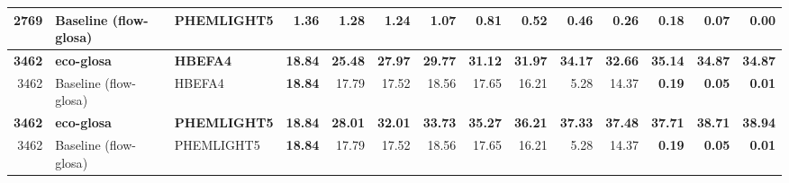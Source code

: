 \begin{table}[htb]
{\begin{tabular}{r l l r *{10}{r}}
    2769 & Baseline (\ac{flow-glosa}) & PHEMLIGHT5 & \textbf{1.36} & 1.28 & 1.24 & 1.07 & 0.81 & 0.52 & 0.46 & 0.26 & 0.18 & 0.07 & 0.00\\
    \midrule
    \textbf{3462} & \textbf{\ac{eco-glosa}} & \textbf{HBEFA4} & \textbf{18.84} & \textbf{25.48} & \textbf{27.97} & \textbf{29.77} & \textbf{31.12} & \textbf{31.97} & \textbf{34.17} & \textbf{32.66} & \textbf{35.14} & \textbf{34.87} & \textbf{34.87}\\
    3462 & Baseline (\ac{flow-glosa}) & HBEFA4 & \textbf{18.84} & 17.79 & 17.52 & 18.56 & 17.65 & 16.21 & 5.28 & 14.37 & \textbf{0.19} & \textbf{0.05} & \textbf{0.01}\\
    \textbf{3462} & \textbf{\ac{eco-glosa}} & \textbf{PHEMLIGHT5} & \textbf{18.84} & \textbf{28.01} & \textbf{32.01} & \textbf{33.73} & \textbf{35.27} & \textbf{36.21} & \textbf{37.33} & \textbf{37.48} & \textbf{37.71} & \textbf{38.71} & \textbf{38.94}\\
    3462 & Baseline (\ac{flow-glosa}) & PHEMLIGHT5 & \textbf{18.84} & 17.79 & 17.52 & 18.56 & 17.65 & 16.21 & 5.28 & 14.37 & \textbf{0.19} & \textbf{0.05} & \textbf{0.01}\\
    \bottomrule
  \end{tabular}}
\end{table}